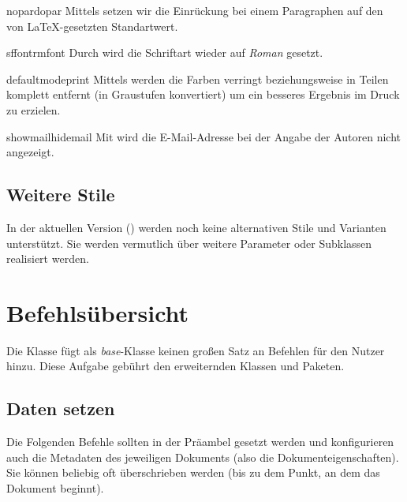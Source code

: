 \documentclass{sopra-base}
\begin{document}
    \begin{argument}{nopar}{dopar}
        Mittels  setzen wir die Einrückung bei einem Paragraphen
        auf den von \LaTeX-gesetzten Standartwert.
    \end{argument}


    \begin{argument}{sffont}{rmfont}
        Durch  wird die Schriftart wieder auf \emph{Roman} gesetzt.
    \end{argument}

    \begin{argument}{defaultmode}{print}
        Mittels  werden die Farben verringt beziehungsweise in Teilen
        komplett entfernt (in Graustufen konvertiert) um ein besseres Ergebnis
        im Druck zu erzielen.
    \end{argument}

    \begin{argument}{showmail}{hidemail}
        Mit  wird die E-Mail-Adresse bei der Angabe der Autoren
        nicht angezeigt.
    \end{argument}

    \subsection{Weitere Stile}
    In der aktuellen Version (\thesobversion) werden noch keine alternativen
    Stile und Varianten unterstützt. Sie werden vermutlich über weitere
    Parameter oder Subklassen realisiert werden.

%
%
%
%

\section{Befehlsübersicht}

Die Klasse fügt als \emph{base}-Klasse keinen großen Satz an Befehlen für
den Nutzer hinzu. Diese Aufgabe gebührt den erweiternden Klassen und Paketen.

\subsection{Daten setzen}
\label{sec:DatenSetzen}
Die Folgenden Befehle sollten in der Präambel gesetzt werden und konfigurieren
auch die Metadaten des jeweiligen Dokuments (also die Dokumenteigenschaften).
Sie können beliebig oft überschrieben werden (bis zu dem Punkt, an dem
das Dokument beginnt). 
\end{document}
